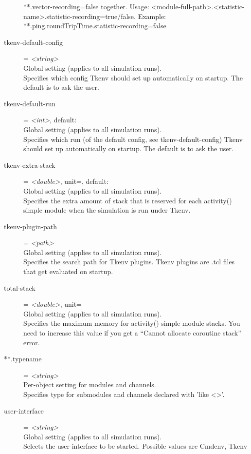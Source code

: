 \begin{description}
    **.vector-recording=false together. Usage:
    <module-full-path>.<statistic-name>.statistic-recording=true/false.
    Example: **.ping.roundTripTime.statistic-recording=false
\item[tkenv-default-config] = \textit{<string>}\\
    Global setting (applies to all simulation runs).\\
    Specifies which config Tkenv should set up automatically on startup. The
    default is to ask the user.
\item[tkenv-default-run] = \textit{<int>}, default: \\
    Global setting (applies to all simulation runs).\\
    Specifies which run (of the default config, see tkenv-default-config) Tkenv
    should set up automatically on startup. The default is to ask the user.
\item[tkenv-extra-stack] = \textit{<double>}, unit=, default: \\
    Global setting (applies to all simulation runs).\\
    Specifies the extra amount of stack that is reserved for each activity()
    simple module when the simulation is run under Tkenv.
\item[tkenv-plugin-path] = \textit{<path>}\\
    Global setting (applies to all simulation runs).\\
    Specifies the search path for Tkenv plugins. Tkenv plugins are .tcl files
    that get evaluated on startup.
\item[total-stack] = \textit{<double>}, unit=\\
    Global setting (applies to all simulation runs).\\
    Specifies the maximum memory for activity() simple module stacks. You need
    to increase this value if you get a ``Cannot allocate coroutine stack''
    error.
\item[**.typename] = \textit{<string>}\\
    Per-object setting for modules and channels.\\
    Specifies type for submodules and channels declared with 'like <>'.
\item[user-interface] = \textit{<string>}\\
    Global setting (applies to all simulation runs).\\
    Selects the user interface to be started. Possible values are Cmdenv, Tkenv

\end{description}
